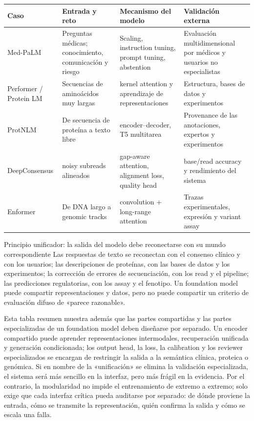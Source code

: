 \begin{longtable}{@{}L{0.19\textwidth}L{0.25\textwidth}L{0.25\textwidth}L{0.19\textwidth}@{}}
\toprule
Caso & Entrada y reto & Mecanismo del modelo & Validación externa \\
\midrule
Med-PaLM & Preguntas médicas; conocimiento, comunicación y riesgo & Scaling, instruction tuning, prompt tuning, abstention & Evaluación multidimensional por médicos y usuarios no especialistas \\
Performer / Protein LM & Secuencias de aminoácidos muy largas & kernel attention y aprendizaje de representaciones & Estructura, bases de datos y experimentos \\
ProtNLM & De secuencia de proteína a texto libre & encoder--decoder, T5 multitarea & Provenance de las anotaciones, expertos y experimentos \\
DeepConsensus & noisy subreads alineados & gap-aware attention, alignment loss, quality head & base/read accuracy y rendimiento del sistema \\
Enformer & De DNA largo a genomic tracks & convolution + long-range attention & Trazas experimentales, expresión y variant assay \\
\bottomrule
\end{longtable}

\begin{importantbox}{Principio unificador: la salida del modelo debe reconectarse con su mundo correspondiente}
Las respuestas de texto se reconectan con el consenso clínico y con los usuarios; las descripciones de proteínas, con las bases de datos y los experimentos; la corrección de errores de secuenciación, con los read y el pipeline; las predicciones regulatorias, con los assay y el fenotipo. Un foundation model puede compartir representaciones y datos, pero no puede compartir un criterio de evaluación difuso de «parece razonable».
\end{importantbox}

Esta tabla resumen muestra además que las partes compartidas y las partes especializadas de un foundation model deben diseñarse por separado. Un encoder compartido puede aprender representaciones intermodales, recuperación unificada y generación condicionada; los output head, la loss, la calibration y los reviewer especializados se encargan de restringir la salida a la semántica clínica, proteica o genómica. Si en nombre de la «unificación» se elimina la validación especializada, el sistema será más sencillo en la interfaz, pero más frágil en la evidencia. Por el contrario, la modularidad no impide el entrenamiento de extremo a extremo; solo exige que cada interfaz crítica pueda auditarse por separado: de dónde proviene la entrada, cómo se transmite la representación, quién confirma la salida y cómo se escala una falla.

